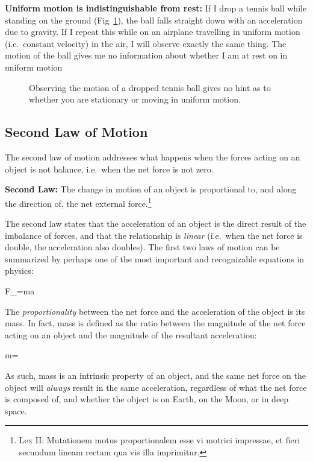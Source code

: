 \textbf{Uniform motion is indistinguishable from rest:} If I drop a tennis ball
while standing on the ground (Fig~\ref{fig:tennisball}), the ball falls
straight down with an acceleration due to gravity. If I repeat this while on an
airplane travelling in uniform motion (i.e.\ constant velocity) in the air, I
will observe exactly the same thing. The motion of the ball gives me no
information about whether I am at rest on in uniform motion
\begin{figure}[ht]
  \centering
  \caption{Observing the motion of a dropped tennis ball gives no hint as to
    whether you are stationary or moving in uniform motion.}
  \label{fig:tennisball}
\end{figure}



\subsection{Second Law of Motion}
\label{sec:2nd-law-of-motion}

The second law of motion addresses what happens when the forces acting on an
object is not balance, i.e.\ when the net force is not zero.

\begin{definition}
  \textbf{Second Law:} The change in motion of an object is proportional to, and
  along the direction of, the net external force.\footnote{Lex II: Mutationem
  motus proportionalem esse vi motrici impressae, et fieri secundum lineam
  rectam qua vis illa imprimitur.}
\end{definition}
The second law states that the acceleration of an object is the direct result
of the imbalance of forces, and that the relationship is \emph{linear} (i.e.\
when the net force is double, the acceleration also doubles). The first two
laws of motion can be summarized by perhaps one of the most important and
recognizable equations in physics:
\begin{important-equation}
  \bm F_=m\bm a
\end{important-equation}
The \emph{proportionality} between the net force and the acceleration of the
object is its mass. In fact, mass is defined as the ratio between the magnitude
of the net force acting on an object and the magnitude of the resultant
acceleration:
\begin{important-equation}
  m=
\end{important-equation}
As such, mass is an intrinsic property of an object, and the same net force on
the object will \emph{always} result in the same acceleration, regardless of
what the net force is composed of, and whether the object is on Earth, on the
Moon, or in deep space.


